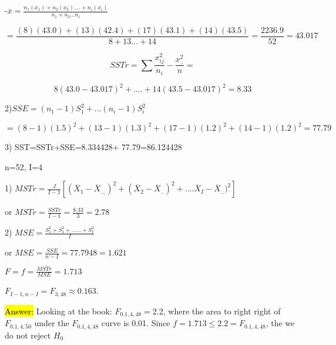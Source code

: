 \documentclass{article}
\begin{document}
-$\overline{x}=\frac{n_{1}(\overline{x_{1}})+n_{2}(\overline{x_{2}})....+n_{i}(\overline{x_{i}})}{n_{1}+n_{2}...n_{i}}$

$$=\frac{(8)(43.0)+(13)(42.4)+(17)(43.1)+(14)( 43.5)}{8+13...+14}=\frac{2236.9}{52}=43.017$$


\vspace{2mm}


$$SSTr=\sum\frac{x^{2}_{ij}}{n_{i}}-\frac{x_{..}^{2}}{n}=$$

$$8(43.0-43.017)^{2}+....+14(43.5-43.017)^{2}=8.33$$


\vspace{4mm}


2)$SSE=(n_{1}-1)S^{2}_{1}+...(n_{i}-1)S^{2}_{i}$

$$=(8-1)(1.5)^{2}+(13-1)(1.3)^{2}+(17-1)(1.2)^{2}+(14-1)(1.2)^{2}=77.79$$


\vspace{4mm}



3) SST=SSTr+SSE=8.334428+ 77.79=86.124428


\vspace{4mm}

n=52, I=4

\vspace{2mm}

1) $MSTr=\frac{J}{I-1}[(\overline{X}_{1}-\overline{X}_{...})^{2}+(\overline{X}_{2}-\overline{X}_{..})^{2}+....\overline{X}_{I}-\overline{X}_{..})^{2}]$

or $MSTr=\frac{SSTr}{I-1}=\frac{8.33}{3}=2.78$

\vspace{4mm}


2) $MSE=\frac{S^{2}_{1}+S^{2}_{1}+......+S^{2}_{I}}{I}$

or $MSE=\frac{SSE}{n-I}={77.79}{48}=1.621$

\vspace{2mm}

\vspace{2mm}

$F=f=\frac{MSTr}{MSE}=1.713$


\vspace{2mm}


$F_{I-1, n-I}=F_{3, 48} \approx 0.163$.

\vspace{2mm}

\hl{Answer:}  Looking at the book: $F_{0.1, 4, 48}=2.2$, where the area to right right of $F_{0.1, 4, 50}$ under the $F_{0.1,4,48}$ curve is 0.01. Since $f=1.713 \le 2.2 =F_{0.1, 4, 48}$, the we do not reject $H_{0}$
\end{document}
